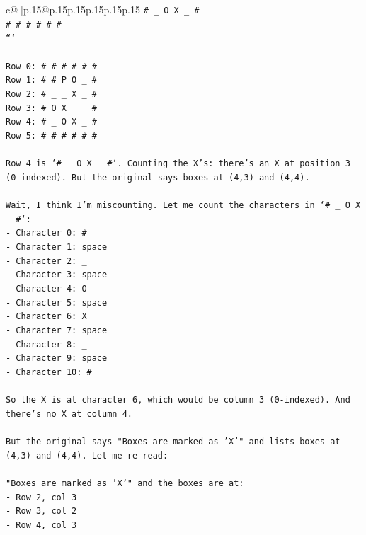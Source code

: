 \documentclass{article}
\begin{document}
{\begin{supertabular}{c@{$\;$}|p{.15\linewidth}@{}p{.15\linewidth}p{.15\linewidth}p{.15\linewidth}p{.15\linewidth}p{.15\linewidth}}
{{{\texttt{\# \_ O X \_ \#} \\
\texttt{\# \# \# \# \# \#} \\
\texttt{```} \\
\\ 
\texttt{Row 0: \# \# \# \# \# \#} \\
\texttt{Row 1: \# \# P O \_ \#} \\
\texttt{Row 2: \# \_ \_ X \_ \#} \\
\texttt{Row 3: \# O X \_ \_ \#} \\
\texttt{Row 4: \# \_ O X \_ \#} \\
\texttt{Row 5: \# \# \# \# \# \#} \\
\\ 
\texttt{Row 4 is `\# \_ O X \_ \#`. Counting the X's: there's an X at position 3 (0{-}indexed). But the original says boxes at (4,3) and (4,4).} \\
\\ 
\texttt{Wait, I think I'm miscounting. Let me count the characters in `\# \_ O X \_ \#`:} \\
\texttt{{-} Character 0: \#} \\
\texttt{{-} Character 1: space} \\
\texttt{{-} Character 2: \_} \\
\texttt{{-} Character 3: space} \\
\texttt{{-} Character 4: O} \\
\texttt{{-} Character 5: space} \\
\texttt{{-} Character 6: X} \\
\texttt{{-} Character 7: space} \\
\texttt{{-} Character 8: \_} \\
\texttt{{-} Character 9: space} \\
\texttt{{-} Character 10: \#} \\
\\ 
\texttt{So the X is at character 6, which would be column 3 (0{-}indexed). And there's no X at column 4.} \\
\\ 
\texttt{But the original says "Boxes are marked as 'X'" and lists boxes at (4,3) and (4,4). Let me re{-}read:} \\
\\ 
\texttt{"Boxes are marked as 'X'" and the boxes are at:} \\
\texttt{{-} Row 2, col 3} \\
\texttt{{-} Row 3, col 2} \\
\texttt{{-} Row 4, col 3} \\
}}}
\end{supertabular}}
\end{document}
